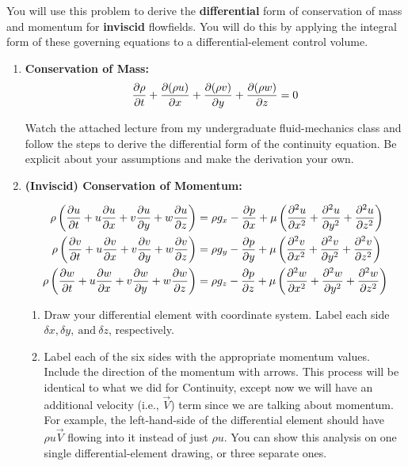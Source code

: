 \documentclass[../main.tex]{subfiles}
\begin{document}

You will use this problem to derive the \textbf{differential} form of conservation of mass and momentum for \textbf{inviscid} flowfields.
You will do this by applying the integral form of these governing equations to a differential-element control volume.

\begin{enumerate}[label = (\alph*)]

    \item \textbf{Conservation of Mass:}
        \[
            \pdv{\rho}{t} + \pdv{(\rho u)}{x} + \pdv{(\rho v)}{y} + \pdv{(\rho w)}{z} = 0
        \]

        Watch the attached lecture from my undergraduate fluid-mechanics class and follow the steps to derive the differential form of the continuity equation.
        Be explicit about your assumptions and make the derivation your own.

    \item \textbf{(Inviscid) Conservation of Momentum:}
    
        \begin{align*}
            \rho \left({\pdv{u}{t} + u \pdv{u}{x} + v \pdv{u}{y} + w \pdv{u}{z}}\right) &= \rho g_x - \pdv{p}{x} + \mu \left({\pdv[2]{u}{x} + \pdv[2]{u}{y} + \pdv[2]{u}{z}}\right)\\
            \rho \left({\pdv{v}{t} + u \pdv{v}{x} + v \pdv{v}{y} + w \pdv{v}{z}}\right) &= \rho g_y - \pdv{p}{y} + \mu \left({\pdv[2]{v}{x} + \pdv[2]{v}{y} + \pdv[2]{v}{z}}\right)\\
            \rho \left({\pdv{w}{t} + u \pdv{w}{x} + v \pdv{w}{y} + w \pdv{w}{z}}\right) &= \rho g_z - \pdv{p}{z} + \mu \left({\pdv[2]{w}{x} + \pdv[2]{w}{y} + \pdv[2]{w}{z}}\right)\\
        \end{align*}

    \begin{enumerate}[label = (b\arabic*)]

        \item 
            Draw your differential element with coordinate system.
            Label each side \(\delta x, \delta y, \ \textrm{and} \ \delta z\), respectively.

        \item
            Label each of the six sides with the appropriate momentum values.
            Include the direction of the momentum with arrows.
            This process will be identical to what we did for Continuity, except now we will have an additional velocity (i.e., \(\vec{V}\)) term since we are talking about momentum.
            For example, the left-hand-side of the differential element should have \(\rho u \vec{V}\) flowing into it instead of just \(\rho u\).
            You can show this analysis on one single differential-element drawing, or three separate ones.


\end{enumerate}
\end{enumerate}
\end{document}

